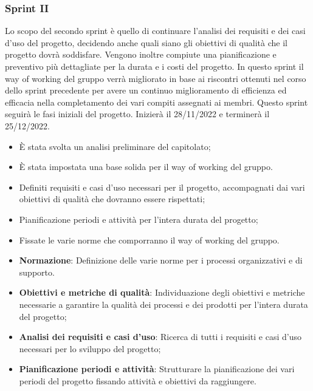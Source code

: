 \subsubsection{Sprint II}\:
Lo scopo del secondo sprint è quello di continuare l'analisi dei requisiti e dei casi d'uso del progetto, decidendo anche quali siano gli obiettivi di qualità che il progetto dovrà soddisfare. Vengono inoltre compiute una pianificazione e preventivo più dettagliate per la durata e i costi del progetto. In questo sprint il way of working del gruppo verrà migliorato in base ai riscontri ottenuti nel corso dello sprint precedente per avere un continuo miglioramento di efficienza ed efficacia nella completamento dei vari compiti assegnati ai membri.
Questo sprint seguirà le fasi iniziali del progetto. Inizierà il 28/11/2022 e terminerà il 25/12/2022.

\:
\begin{itemize}
	\item È stata svolta un analisi preliminare del capitolato;
	\item È stata impostata una base solida per il way of working del gruppo.
\end{itemize}

\:
\begin{itemize}
	\item Definiti requisiti e casi d'uso necessari per il progetto, accompagnati dai vari obiettivi di qualità che dovranno essere rispettati;
	\item Pianificazione periodi e attività per l'intera durata del progetto;
	\item Fissate le varie norme che comporranno il way of working del gruppo.
\end{itemize}

\:
\begin{itemize}
	\item \textbf{Normazione}: Definizione delle varie norme per i processi organizzativi e di supporto.
	\item \textbf{Obiettivi e metriche di qualità}: Individuazione degli obiettivi e metriche necessarie a garantire la qualità dei processi e dei prodotti per l'intera durata del progetto;
	\item \textbf{Analisi dei requisiti e casi d'uso}: Ricerca di tutti i requisiti e casi d'uso necessari per lo sviluppo del progetto;
	\item \textbf{Pianificazione periodi e attività}: Strutturare la pianificazione dei vari periodi del progetto fissando attività e obiettivi da raggiungere.
\end{itemize}

